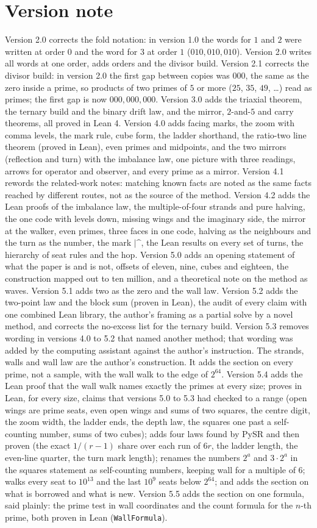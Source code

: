\documentclass[11pt]{article}
\begin{document}
\section*{Version note}
Version 2.0 corrects the fold notation: in version 1.0 the words for $1$ and $2$ were written at order $0$ and the word for $3$ at order $1$ ($010,010,010$). Version 2.0 writes all words at one order, adds orders and the divisor build. Version 2.1 corrects the divisor build: in version 2.0 the first gap between copies was $000$, the same as the zero inside a prime, so products of two primes of $5$ or more ($25$, $35$, $49$, \dots) read as primes; the first gap is now $000,000,000$. Version 3.0 adds the triaxial theorem, the ternary build and the binary drift law, and the mirror, $2$-and-$5$ and carry theorems, all proved in Lean 4. Version 4.0 adds facing marks, the zoom with comma levels, the mark rule, cube form, the ladder shorthand, the ratio-two line theorem (proved in Lean), even primes and midpoints, and the two mirrors (reflection and turn) with the imbalance law, one picture with three readings, arrows for operator and observer, and every prime as a mirror. Version 4.1 rewords the related-work notes: matching known facts are noted as the same facts reached by different routes, not as the source of the method. Version 4.2 adds the Lean proofs of the imbalance law, the multiple-of-four strands and pure halving, the one code with levels down, missing wings and the imaginary side, the mirror at the walker, even primes, three faces in one code, halving as the neighbours and the turn as the number, the mark $|\text{\textasciicircum}$, the Lean results on every set of turns, the hierarchy of seat rules and the hop. Version 5.0 adds an opening statement of what the paper is and is not, offsets of eleven, nine, cubes and eighteen, the construction mapped out to ten million, and a theoretical note on the method as waves. Version 5.1 adds two as the zero and the wall law. Version 5.2 adds the two-point law and the block sum (proven in Lean), the audit of every claim with one combined Lean library, the author's framing as a partial solve by a novel method, and corrects the no-excess list for the ternary build. Version 5.3 removes wording in versions 4.0 to 5.2 that named another method; that wording was added by the computing assistant against the author's instruction. The strands, walls and wall law are the author's construction. It adds the section on every prime, not a sample, with the wall walk to the edge of $2^{64}$. Version 5.4 adds the Lean proof that the wall walk names exactly the primes at every size; proves in Lean, for every size, claims that versions 5.0 to 5.3 had checked to a range (open wings are prime seats, even open wings and sums of two squares, the centre digit, the zoom width, the ladder ends, the depth law, the squares one past a self-counting number, sums of two cubes); adds four laws found by PySR and then proven (the exact $1/(r-1)$ share over each run of $6r$, the ladder length, the even-line quarter, the turn mark length); renames the numbers $2^a$ and $3\cdot2^a$ in the squares statement as self-counting numbers, keeping wall for a multiple of $6$; walks every seat to $10^{13}$ and the last $10^9$ seats below $2^{64}$; and adds the section on what is borrowed and what is new. Version 5.5 adds the section on one formula, said plainly: the prime test in wall coordinates and the count formula for the $n$-th prime, both proven in Lean (\texttt{WallFormula}).
\end{document}
